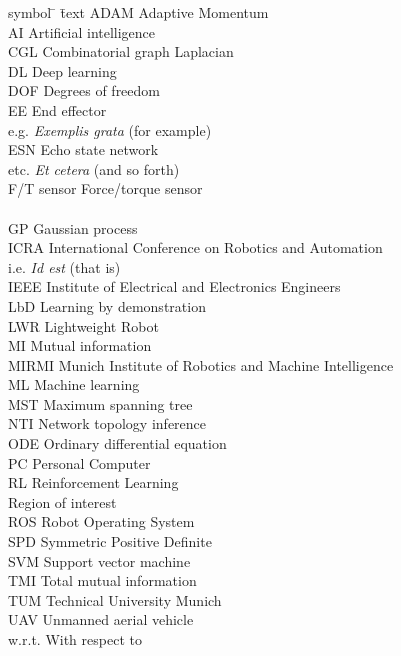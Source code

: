 \begin{tabbing}
symbol \= \hspace{1.5cm} \= text \kill
%
ADAM \> \> Adaptive Momentum \\[1.1ex]
AI \> \> Artificial intelligence \\[1.1ex]
CGL \> \> Combinatorial graph Laplacian \\[1.1ex]
DL \> \> Deep learning \\[1.1ex]
DOF \> \> Degrees of freedom \\[1.1ex]
EE \> \> End effector \\[1.1ex]
e.g. \> \> \textit{Exemplis grata} (for example) \\[1.1ex]
ESN \> \> Echo state network \\[1.1ex]
etc. \> \> \textit{Et cetera} (and so forth) \\[1.1ex]
F/T sensor \> \> Force/torque sensor \\[1.1ex]
\skillmodelabbr{} \> \> \skillmodelcap{} \\[1.1ex]
GP \> \> Gaussian process \\[1.1ex]
ICRA \> \> International Conference on Robotics and Automation \\[1.1ex]
i.e. \> \> \textit{Id est} (that is) \\[1.1ex]
IEEE \> \> Institute of Electrical and Electronics Engineers \\[1.1ex]
LbD \> \> Learning by demonstration \\[1.1ex]
LWR \> \> Lightweight Robot \\[1.1ex]
MI \> \> Mutual information \\[1.1ex]
MIRMI \> \> Munich Institute of Robotics and Machine Intelligence \\[1.1ex]
ML \> \> Machine learning \\[1.1ex]
MST \> \> Maximum spanning tree \\[1.1ex]
NTI \> \> Network topology inference \\[1.1ex]
ODE \> \> Ordinary differential equation \\[1.1ex]
PC \> \> Personal Computer \\[1.1ex]
RL \> \> Reinforcement Learning \\[1.1ex]
\roi{} \> \> Region of interest \\[1.1ex]
ROS \> \> Robot Operating System \\[1.1ex]
SPD \> \> Symmetric Positive Definite \\[1.1ex]
SVM \> \> Support vector machine \\[1.1ex]
TMI \> \> Total mutual information\\[1.1ex]
TUM \> \> Technical University Munich \\[1.1ex]
UAV \> \> Unmanned aerial vehicle \\[1.1ex]
w.r.t. \> \> With respect to \\[1.1ex]
\end{tabbing}